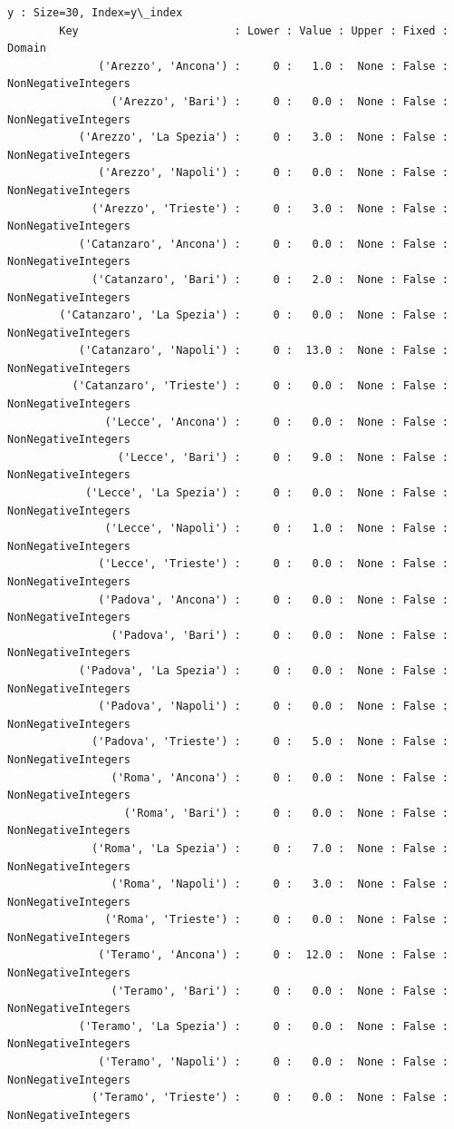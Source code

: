\documentclass[11pt]{article}
\begin{document}
\begin{Verbatim}[commandchars=\\\{\}]
    y : Size=30, Index=y\_index
        Key                        : Lower : Value : Upper : Fixed : Domain
              ('Arezzo', 'Ancona') :     0 :   1.0 :  None : False : NonNegativeIntegers
                ('Arezzo', 'Bari') :     0 :   0.0 :  None : False : NonNegativeIntegers
           ('Arezzo', 'La Spezia') :     0 :   3.0 :  None : False : NonNegativeIntegers
              ('Arezzo', 'Napoli') :     0 :   0.0 :  None : False : NonNegativeIntegers
             ('Arezzo', 'Trieste') :     0 :   3.0 :  None : False : NonNegativeIntegers
           ('Catanzaro', 'Ancona') :     0 :   0.0 :  None : False : NonNegativeIntegers
             ('Catanzaro', 'Bari') :     0 :   2.0 :  None : False : NonNegativeIntegers
        ('Catanzaro', 'La Spezia') :     0 :   0.0 :  None : False : NonNegativeIntegers
           ('Catanzaro', 'Napoli') :     0 :  13.0 :  None : False : NonNegativeIntegers
          ('Catanzaro', 'Trieste') :     0 :   0.0 :  None : False : NonNegativeIntegers
               ('Lecce', 'Ancona') :     0 :   0.0 :  None : False : NonNegativeIntegers
                 ('Lecce', 'Bari') :     0 :   9.0 :  None : False : NonNegativeIntegers
            ('Lecce', 'La Spezia') :     0 :   0.0 :  None : False : NonNegativeIntegers
               ('Lecce', 'Napoli') :     0 :   1.0 :  None : False : NonNegativeIntegers
              ('Lecce', 'Trieste') :     0 :   0.0 :  None : False : NonNegativeIntegers
              ('Padova', 'Ancona') :     0 :   0.0 :  None : False : NonNegativeIntegers
                ('Padova', 'Bari') :     0 :   0.0 :  None : False : NonNegativeIntegers
           ('Padova', 'La Spezia') :     0 :   0.0 :  None : False : NonNegativeIntegers
              ('Padova', 'Napoli') :     0 :   0.0 :  None : False : NonNegativeIntegers
             ('Padova', 'Trieste') :     0 :   5.0 :  None : False : NonNegativeIntegers
                ('Roma', 'Ancona') :     0 :   0.0 :  None : False : NonNegativeIntegers
                  ('Roma', 'Bari') :     0 :   0.0 :  None : False : NonNegativeIntegers
             ('Roma', 'La Spezia') :     0 :   7.0 :  None : False : NonNegativeIntegers
                ('Roma', 'Napoli') :     0 :   3.0 :  None : False : NonNegativeIntegers
               ('Roma', 'Trieste') :     0 :   0.0 :  None : False : NonNegativeIntegers
              ('Teramo', 'Ancona') :     0 :  12.0 :  None : False : NonNegativeIntegers
                ('Teramo', 'Bari') :     0 :   0.0 :  None : False : NonNegativeIntegers
           ('Teramo', 'La Spezia') :     0 :   0.0 :  None : False : NonNegativeIntegers
              ('Teramo', 'Napoli') :     0 :   0.0 :  None : False : NonNegativeIntegers
             ('Teramo', 'Trieste') :     0 :   0.0 :  None : False : NonNegativeIntegers


\end{Verbatim}
\end{document}
